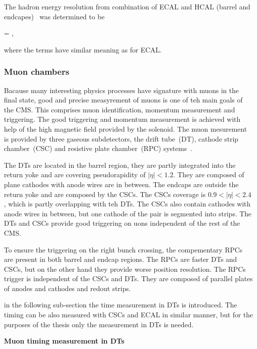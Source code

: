 The hadron energy resolution from combination of ECAL and HCAL (barrel and endcapes)~\cite{Chatrchyan:2009ag} was determined to be


{
  =   ,
}

where the terms have similar meaning as for ECAL.

\subsubsection{Muon chambers}

Bacause many interesting physics processes have signature with muons in the final state, good and precise measyrement of muons is one of teh main goals of the CMS. This comprises muon identification, momentum measurement and triggering. The good triggering and momentum measurement is achieved with help of the high magnetic field provided by the solenoid. The muon mesurement is provided by three gaseous subdetectors, the drift tube~(DT), cathode strip chamber~(CSC) and resistive plate chamber~(RPC) systems~\cite{tdrMuon}.

The DTs are located in the barrel region, they are partly integrated into the return yoke and are covering pseudorapidity of $|\eta|<1.2$. They are composed of plane cathodes with anode wires are in between. The endcaps are outside the return yoke and are composed by the CSCs. The CSCs coverage is $0.9<|\eta|<2.4$, which is partly overlapping with teh DTs. The CSCs also contain cathodes with anode wires in between, but one cathode of the pair is segmented into strips. The DTs and CSCs provide good triggering on uons independent of the rest of the CMS.

To ensure the triggering on the right bunch crossing, the compementary RPCs are present in both barrel and endcap regions. The RPCs are faster DTs and CSCs, but on the other hand they provide worse position resolution. The RPCs trigger is independent of the CSCs and DTs. They are composed of parallel plates of anodes and cathodes and redout strips. 

in the following sub-section the time measurement in DTs is introduced. The timing can be also measured with CSCs and ECAL in similar manner, but for the purposes of the thesis only the measurement in DTs is needed.

\textbf{Muon timing measurement in DTs}

